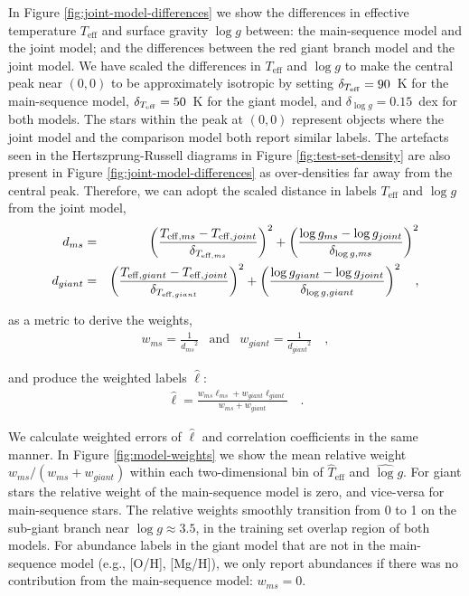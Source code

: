 \documentclass[preprint,trackchanges]{aastex}
\newcommand{\teff}{T_{\mathrm{eff}}}
\newcommand{\logg}{\log g}
\begin{document}
In Figure \ref{fig:joint-model-differences} we show the differences in effective temperature
$\teff$ and surface gravity $\logg$ between: the main-sequence model and the joint
model; and the differences between the red giant branch model and the joint model. We have scaled
the differences in $\teff$ and $\logg$ to make the central peak near $(0, 0)$ to 
be approximately isotropic by setting
	$\delta_{T_{\rm eff}} = 90$~K for the main-sequence model, 
	$\delta_{T_{\rm eff}} = 50$~K for the giant model, and 
	$\delta_{\log{g}} = 0.15$~dex for both models.
The stars within the peak at $(0, 0)$ represent objects where
the joint model and the comparison model both report similar labels.  The artefacts 
seen in the Hertszprung-Russell diagrams in Figure \ref{fig:test-set-density} are
also present in Figure \ref{fig:joint-model-differences} as over-densities far away
from the central peak.  Therefore, we can 
adopt the scaled distance in labels $\teff$ and $\logg$ from the joint model,
\begin{eqnarray}
	d_{ms} & = & \left(\frac{T_{{\rm eff},ms} - T_{{\rm eff},joint}}{\delta_{T_{{\rm eff},ms}}}\right)^2 + \left(\frac{\log{g}_{ms} - \log{g}_{joint}}{\delta_{\log{g},ms}}\right)^2   \nonumber \\
	d_{giant} & = & \left(\frac{T_{{\rm eff},giant} - T_{{\rm eff},joint}}{\delta_{T_{{\rm eff},giant}}}\right)^2 + \left(\frac{\log{g}_{giant} - \log{g}_{joint}}{\delta_{\log{g},giant}}\right)^2   \quad ,
\end{eqnarray}

\noindent{}as a metric to derive the weights,
\begin{eqnarray}
	w_{ms} = \frac{1}{{d_{ms}}^2} & \text{and} & w_{giant} = \frac{1}{{d_{giant}}^2} \quad ,
\end{eqnarray}

\noindent{}and produce the weighted labels $\hat\ell$:
\begin{eqnarray}
	\hat\ell = \frac{w_{ms}\ell_{ms} + w_{giant}\ell_{giant}}{w_{ms} + w_{giant}} \quad .
\end{eqnarray}

We calculate weighted errors of $\hat\ell$ and correlation coefficients in 
the same manner.  In Figure \ref{fig:model-weights} we show the mean relative
weight $w_{ms}/(w_{ms} + w_{giant})$ within each two-dimensional bin of 
$\hat\teff$ and $\hat\logg$.  For giant stars the relative weight of 
the main-sequence model is zero, and vice-versa for main-sequence stars.
The relative weights smoothly transition from 0 to 1 on the sub-giant branch
near $\log{g} \approx 3.5$, in the training set overlap region of both models.
For abundance labels in the giant model that are not in the main-sequence
model (e.g., [O/H], [Mg/H]), we only report abundances if there was no contribution
from the main-sequence model: $w_{ms} = 0$.
\end{document}
